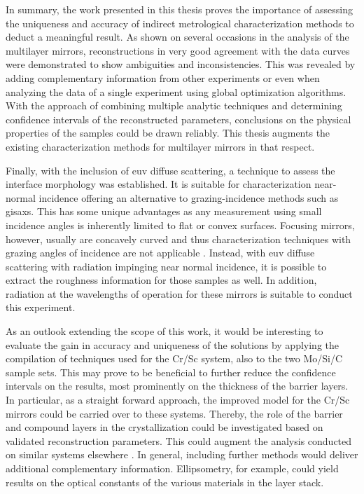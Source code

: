 In summary, the work presented in this thesis proves the importance of assessing the uniqueness and accuracy of indirect metrological characterization methods to deduct a meaningful result. As shown on several occasions in the analysis of the multilayer mirrors, reconstructions in very good agreement with the data curves were demonstrated to show ambiguities and inconsistencies. This was revealed by adding complementary information from other experiments or even when analyzing the data of a single experiment using global optimization algorithms. With the approach of combining multiple analytic techniques and determining confidence intervals of the reconstructed parameters, conclusions on the physical properties of the samples could be drawn reliably. This thesis augments the existing characterization methods for multilayer mirrors in that respect.

Finally, with the inclusion of \gls{euv} diffuse scattering, a technique to assess the interface morphology was established. It is suitable for characterization near-normal incidence offering an alternative to grazing-incidence methods such as \gls{gisaxs}. This has some unique advantages as any measurement using small incidence angles is inherently limited to flat or convex surfaces. Focusing mirrors, however, usually are concavely curved and thus characterization techniques with grazing angles of incidence are not applicable . Instead, with \gls{euv} diffuse scattering with radiation impinging near normal incidence, it is possible to extract the roughness information for those samples as well. In addition, radiation at the wavelengths of operation for these mirrors is suitable to conduct this experiment.

As an outlook extending the scope of this work, it would be interesting to evaluate the gain in accuracy and uniqueness of the solutions by applying the compilation of techniques used for the Cr/Sc system, also to the two Mo/Si/C sample sets. This may prove to be beneficial to further reduce the confidence intervals on the results, most prominently on the thickness of the barrier layers. In particular, as a straight forward approach, the improved model for the Cr/Sc mirrors could be carried over to these systems. Thereby, the role of the barrier and compound layers in the crystallization could be investigated based on validated reconstruction parameters. This could augment the analysis conducted on similar systems elsewhere \cite{bajt_investigation_2001}. In general, including further methods would deliver additional complementary information. Ellipsometry, for example, could yield results on the optical constants of the various materials in the layer stack.
